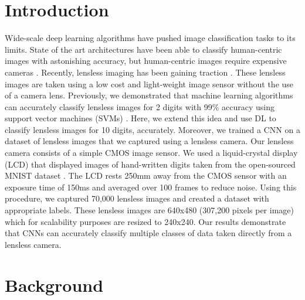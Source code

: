 \documentclass[11pt,conference]{ieeeconf}
\begin{document}
\section{Introduction}
Wide-scale deep learning algorithms have pushed image classification tasks to its limits. State of the art architectures have been able to classify human-centric images with astonishing accuracy, but human-centric images require expensive cameras \cite{DBLP:journals/corr/SimonyanZ14a, DBLP:journals/corr/SzegedyIV16}. Recently, lensless imaging has been gaining traction \cite{DBLP:journals/corr/AsifASVB15, Gill:13, DBLP:journals/corr/KimIPM17}. These lensless images are taken using a low cost and light-weight image sensor without the use of a camera lens. Previously, we demonstrated that machine learning algorithms can accurately classify lensless images for 2 digits with 99\% accuracy using support vector machines (SVMs) \cite{DBLP:journals/corr/abs-1709-00408}. Here, we extend this idea and use DL to classify lensless images for 10 digits, accurately. Moreover, we trained a CNN on a dataset of lensless images that we captured using a lensless camera.
%
Our lensless camera consists of a simple CMOS image sensor. We used a liquid-crystal display (LCD) that displayed images of hand-written digits taken from the open-sourced MNIST dataset \cite{lecun-mnisthandwrittendigit-2010}. The LCD rests 250mm away from the CMOS sensor with an exposure time of 150ms and averaged over 100 frames to reduce noise. Using this procedure, we captured 70,000 lensless images and created a dataset with appropriate labels. These lensless images are 640x480 (307,200 pixels per image) which for scalability purposes are resized to 240x240.
%
Our results demonstrate that CNNs can accurately classify multiple classes of data taken directly from a lensless camera.
%
\section{Background}
%
\end{document}

